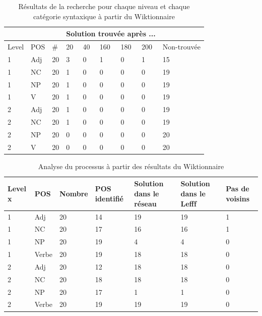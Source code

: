 \begin{table}[ht]
\centering
\begin{tabular}{|p{0.8cm} |p{0.8cm} |p{0.8cm}| p{0.8cm} |p{0.8cm}|p{0.8cm}|p{0.8cm}|p{0.8cm}|p{2.8cm}}
\hline
 &  &  & \multicolumn{5}{c}{Solution trouvée après ...} & \\[0.5ex]
\hline
Level & POS & \# & 20 & 40 & 160 & 180 & 200 & Non-trouvée\\[0.5ex]
\hline
\hline
1 & Adj & 20 & 3 & 0 & 1 & 0 & 1 & 15 \\[0.5ex]
\hline
1 & NC & 20 & 1 & 0 & 0 & 0 & 0 & 19 \\[0.5ex]
\hline
1 & NP & 20 & 1 & 0 & 0 & 0 & 0 & 19 \\[0.5ex]
\hline
1 & V & 20 & 1 & 0 & 0 & 0 & 0 & 19 \\[0.5ex]
\hline
2 & Adj & 20 & 1 & 0 & 0 & 0 & 0 & 19 \\[0.5ex]
\hline
2 & NC & 20 & 1 & 0 & 0 & 0 & 0 & 19 \\[0.5ex]
\hline
2 & NP & 20 & 0 & 0 & 0 & 0 & 0 & 20 \\[0.5ex]
\hline
2 & V & 20 & 0 & 0 & 0 & 0 & 0 & 20\\[0.5ex]
\hline
\end{tabular}
\caption{Résultats de la recherche pour chaque niveau et chaque catégorie syntaxique à partir du Wiktionnaire}
\label{table:resultscrosswords}
\end{table}

\begin{table}[ht]
\centering
\begin{tabular}{|p{1.8cm}|p{1.8cm}|p{1.8cm}|p{1.8cm}|p{1.8cm}|p{1.8cm}|p{1.8cm}|}
\hline
Level x & POS & Nombre & POS identifié & Solution dans le réseau & Solution dans le Lefff & Pas de voisins\\[0.5ex]
\hline\hline
1 & Adj & 20 & 14 & 19 & 19 & 1 \\[0.5ex]
\hline
1 & NC & 20 & 17 & 16 & 16 & 1 \\[0.5ex] 
\hline
1 & NP & 20 & 19 & 4 & 4 & 0 \\[0.5ex]
\hline
1 & Verbe & 20 & 19 & 18 & 18 & 0 \\[0.5ex]
\hline
2 & Adj & 20 & 12 & 18 & 18 & 0 \\[0.5ex]
\hline
2 & NC & 20 & 18 & 18 & 18 & 0 \\[0.5ex] 
\hline
2 & NP & 20 & 17 & 1 & 1 & 0 \\[0.5ex]
\hline
2 & Verbe & 20 & 19 & 19 & 19 & 0 \\[0.5ex]
\hline
\end{tabular}
\caption{Analyse du processus à partir des résultats du Wiktionnaire}
\label{table:anaprocesscrosswords}
\end{table}


